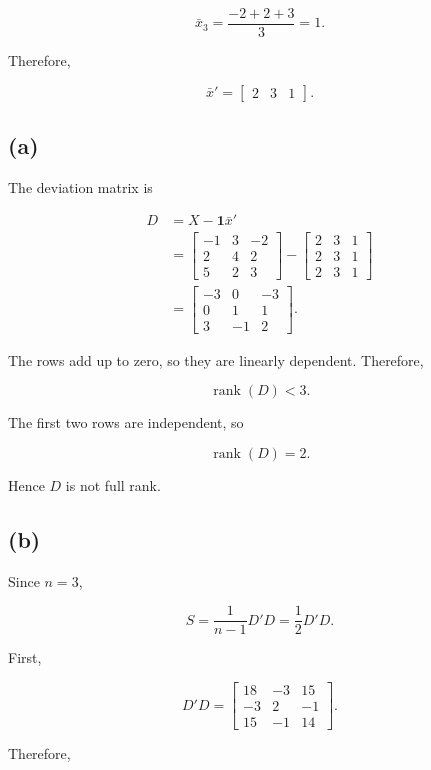 \documentclass[12pt]{article}
\begin{document}
$$
\bar{x}_3=\frac{-2+2+3}{3}=1.
$$

Therefore,

$$
\bar{x}'=
\begin{bmatrix}
2&3&1
\end{bmatrix}.
$$

\subsection*{(a)}

The deviation matrix is

$$
\begin{aligned}
D
&=X-\mathbf{1}\bar{x}'\\
&=
\begin{bmatrix}
-1&3&-2\\
2&4&2\\
5&2&3
\end{bmatrix}
-
\begin{bmatrix}
2&3&1\\
2&3&1\\
2&3&1
\end{bmatrix}\\
&=
\boxed{
\begin{bmatrix}
-3&0&-3\\
0&1&1\\
3&-1&2
\end{bmatrix}}.
\end{aligned}
$$

The rows add up to zero, so they are linearly dependent. Therefore,

$$
\operatorname{rank}(D)<3.
$$

The first two rows are independent, so

$$
\boxed{\operatorname{rank}(D)=2}.
$$

Hence $D$ is not full rank.

\subsection*{(b)}

Since $n=3$,

$$
S=\frac{1}{n-1}D'D
=\frac12D'D.
$$

First,

$$
D'D=
\begin{bmatrix}
18&-3&15\\
-3&2&-1\\
15&-1&14
\end{bmatrix}.
$$

Therefore,
\end{document}
